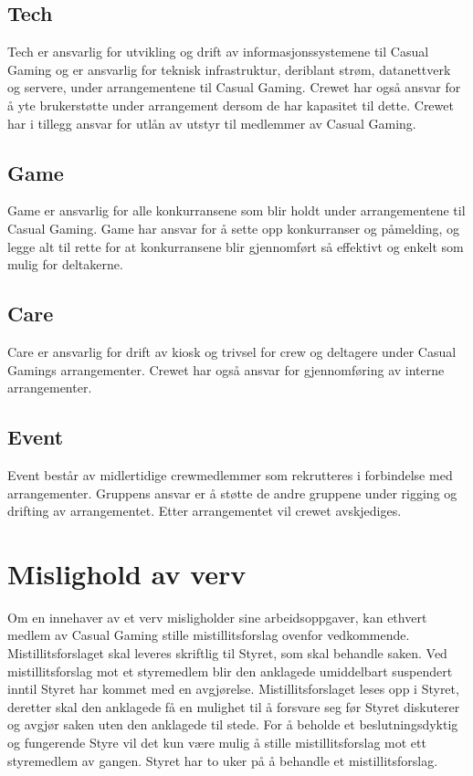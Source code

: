 \subsection{Tech}
Tech er ansvarlig for utvikling og drift av informasjonssystemene til Casual Gaming og er ansvarlig for teknisk infrastruktur, deriblant strøm, datanettverk og servere, under arrangementene til Casual Gaming. Crewet har også ansvar for å yte brukerstøtte under arrangement dersom de har kapasitet til dette. Crewet har i tillegg ansvar for utlån av utstyr til medlemmer av Casual Gaming.

\subsection{Game}
Game er ansvarlig for alle konkurransene som blir holdt under arrangementene til Casual Gaming. Game har ansvar for å sette opp konkurranser og påmelding, og legge alt til rette for at konkurransene blir gjennomført så effektivt og enkelt som mulig for deltakerne.

\subsection{Care}
Care er ansvarlig for drift av kiosk og trivsel for crew og deltagere under Casual Gamings arrangementer. Crewet har også ansvar for gjennomføring av interne arrangementer.

\subsection{Event}
Event består av midlertidige crewmedlemmer som rekrutteres i forbindelse med arrangementer. Gruppens ansvar er å støtte de andre gruppene under rigging og drifting av arrangementet. Etter arrangementet vil crewet avskjediges.

\section{Mislighold av verv}
Om en innehaver av et verv misligholder sine arbeidsoppgaver, kan ethvert medlem av Casual Gaming stille mistillitsforslag ovenfor vedkommende. Mistillitsforslaget skal leveres skriftlig til Styret, som skal behandle saken. Ved mistillitsforslag mot et styremedlem blir den anklagede umiddelbart suspendert inntil Styret har kommet med en avgjørelse. Mistillitsforslaget leses opp i Styret, deretter skal den anklagede få en mulighet til å forsvare seg før Styret diskuterer og avgjør saken uten den anklagede til stede. For å beholde et beslutningsdyktig og fungerende Styre vil det kun være mulig å stille mistillitsforslag mot ett styremedlem av gangen. Styret har to uker på å behandle et mistillitsforslag.
